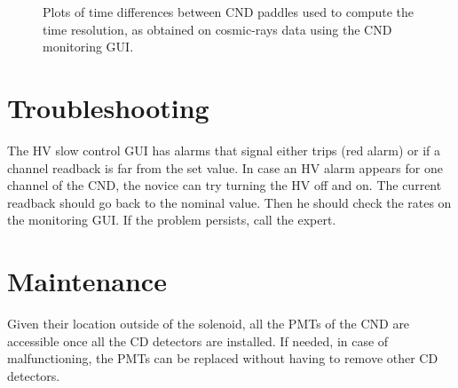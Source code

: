 \documentclass[12pt]{article}
\begin{document}
\begin{figure}
\begin{center}
\caption {Plots of time differences between CND paddles used to compute the time resolution, as obtained on cosmic-rays data using the CND monitoring GUI. }
\label{monitor2}
\end{center}
\end{figure}

\section{Troubleshooting}
The HV slow control GUI has alarms that signal either trips (red alarm) or if a channel readback is far from the set value. In case an HV alarm appears for one channel of the CND, the novice can try turning the HV off and on. The current readback should go back to the nominal value. Then he should check the rates on the monitoring GUI. If the problem persists, call the expert. 

\section{Maintenance}
Given their location outside of the solenoid, all the PMTs of the CND are accessible once all the CD detectors are installed. If needed, in case of malfunctioning, the PMTs can be replaced without having to remove other CD detectors. 
\end{document}
